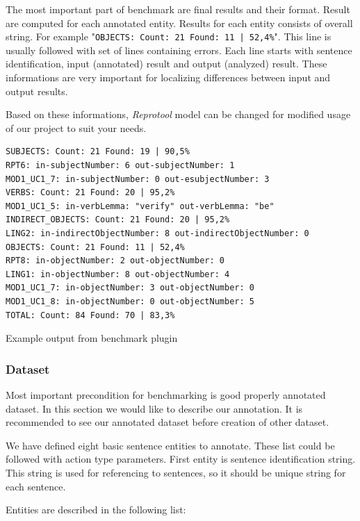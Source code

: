 The most important part of benchmark are final results and their format. Result are computed for each annotated entity. Results for each entity consists of overall string. For example "{\tt OBJECTS: Count: 21 Found: 11 | 52,4\%}". This line is usually followed with set of lines containing errors. Each line starts with sentence identification, input (annotated) result and  output (analyzed) result. These informations are very important for localizing differences between input and output results.

Based on these informations, \emph{Reprotool} model can be changed for modified usage of our project to suit your needs.

\begin{table}[ht]   %
\begin{center}
    \begin{verbatim}
SUBJECTS: Count: 21 Found: 19 | 90,5%
RPT6: in-subjectNumber: 6 out-subjectNumber: 1
MOD1_UC1_7: in-subjectNumber: 0 out-esubjectNumber: 3
VERBS: Count: 21 Found: 20 | 95,2%
MOD1_UC1_5: in-verbLemma: "verify" out-verbLemma: "be"
INDIRECT_OBJECTS: Count: 21 Found: 20 | 95,2%
LING2: in-indirectObjectNumber: 8 out-indirectObjectNumber: 0
OBJECTS: Count: 21 Found: 11 | 52,4%
RPT8: in-objectNumber: 2 out-objectNumber: 0
LING1: in-objectNumber: 8 out-objectNumber: 4
MOD1_UC1_7: in-objectNumber: 3 out-objectNumber: 0
MOD1_UC1_8: in-objectNumber: 0 out-objectNumber: 5
TOTAL: Count: 84 Found: 70 | 83,3%   
    \end{verbatim}
  \caption{Example output from benchmark plugin}
  \label{tab.benchmarkexample}
\end{center}
\end{table}   
      
      
\subsubsection{Dataset}
\label{sec:dataset}
Most important precondition for benchmarking is good properly annotated dataset. In this section we would like to describe our annotation. It is recommended to see our annotated dataset before creation of other dataset.

We have defined eight basic sentence entities to annotate. These list could be followed with action type parameters. First entity is sentence identification string. This string is used for referencing to sentences, so it should be unique string for each sentence.

Entities are described in the following list:

